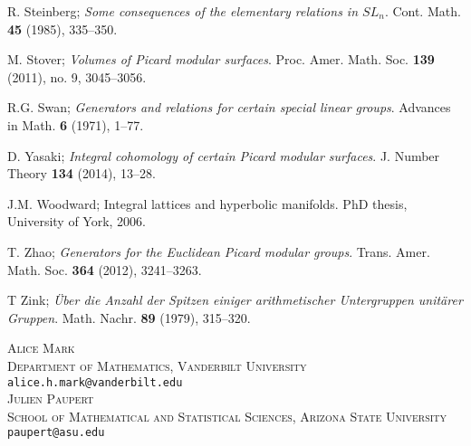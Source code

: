\documentclass{article}[12pt]
\begin{document}
\begin{thebibliography}{ZZ99}
   R. Steinberg; {\sl Some consequences of the elementary relations in $SL_n$}. Cont. Math. {\bf 45} (1985), 335--350.
  
 M. Stover; {\sl Volumes of Picard modular surfaces}. Proc. Amer. Math. Soc. {\bf 139} (2011), no. 9, 3045--3056. 


 R.G. Swan; {\sl Generators and relations for certain special linear groups}. Advances in Math. {\bf 6} (1971), 1--77.

 D. Yasaki; {\sl Integral cohomology of certain Picard modular surfaces}. J. Number Theory {\bf 134} (2014), 13--28.

 J.M. Woodward; Integral lattices and hyperbolic manifolds. PhD thesis, University of York, 2006.
  
 T. Zhao; {\sl Generators for the Euclidean Picard modular groups}. Trans. Amer. Math. Soc. {\bf 364} (2012), 3241--3263.

 T Zink; {\sl \"Uber die Anzahl der Spitzen einiger arithmetischer Untergruppen unit\"arer Gruppen}. Math. Nachr. {\bf 89} (1979), 315--320.

\end{thebibliography}
\begin{flushleft}

 \textsc{Alice Mark\\
   Department of Mathematics, Vanderbilt University}\\
       \verb|alice.h.mark@vanderbilt.edu|
\\

  \textsc{Julien Paupert\\
   School of Mathematical and Statistical Sciences, Arizona State University}\\
       \verb|paupert@asu.edu|
\end{flushleft}
\end{document}
